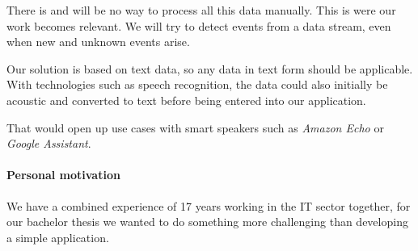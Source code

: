 There is and will be no way to process all this data manually.
This is were our work becomes relevant.
We will try to detect events from a data stream, even when new and unknown events arise.

Our solution is based on text data, so any data in text form should be applicable.
With technologies such as speech recognition, the data could also initially be acoustic
and converted to text before being entered into our application.

That would open up use cases with smart speakers such as \textit{Amazon Echo} or \textit{Google Assistant}.

\paragraph{Personal motivation}
We have a combined experience of 17 years working in the IT sector together,
for our bachelor thesis we wanted to do something more challenging than
developing a simple application.

